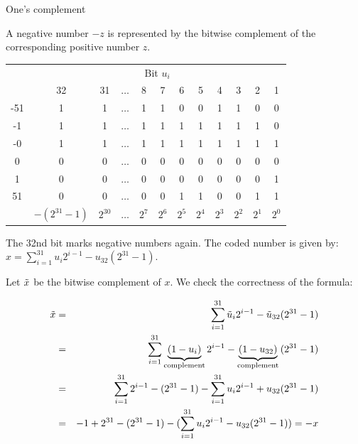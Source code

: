 \documentclass[11pt,compress,t,notes=noshow, xcolor=table]{beamer}
\begin{document}
\begin{vbframe}{One's complement}

A negative number $-z$ is represented by the bitwise complement of the corresponding positive number $z$.

\begin{footnotesize}
\begin{center}
  \begin{tabular}{ c | ccccccccccc}
    & \multicolumn{11}{c}{Bit $u_i$} \\
     & 32 & 31  & $\hdots$ & 8 & 7 & 6 & 5 & 4 & 3 & 2 & 1 \\
    \hline
    -51 & 1 & 1 & $\hdots$ & 1 & 1 & 0 & 0 & 1 & 1 & 0 & 0 \\
     -1 & 1 & 1 & $\hdots$ & 1 & 1 & 1 & 1 & 1 & 1 & 1 & 0 \\
     -0 & 1 & 1 & $\hdots$ & 1 & 1 & 1 & 1 & 1 & 1 & 1 & 1 \\
      0 & 0 & 0 & $\hdots$ & 0 & 0 & 0 & 0 & 0 & 0 & 0 & 0 \\
      1 & 0 & 0 & $\hdots$ & 0 & 0 & 0 & 0 & 0 & 0 & 0 & 1 \\
     51 & 0 & 0 & $\hdots$ & 0 & 0 & 1 & 1 & 0 & 0 & 1 & 1 \\
    \hline
       & $-(2^{31} - 1)$ & $2^{30}$ & $\hdots$ & $2^7$ & $2^6$ & $2^5$ & $2^4$ & $2^3$ & $2^2$ & $2^1$ & $2^0$
  \end{tabular}
\end{center}
\end{footnotesize}

The 32nd bit marks negative numbers again.
The coded number is given by: $x = \sum_{i=1}^{31} u_i 2^{i-1} - u_{32}(2^{31} - 1)$.

\framebreak

Let $\tilde x$ be the bitwise complement of $x$. We check the correctness of the formula: 

\vspace*{-.5cm}

\begin{eqnarray*}
  \tilde x &=& \sum_{i=1}^{31} \tilde u_i 2^{i-1} - \tilde u_{32}(2^{31} - 1) \\
  &=& \sum_{i=1}^{31} \underbrace{(1 - u_i)}_{\text{complement}} 2^{i-1} - \underbrace{(1 - u_{32})}_{\text{complement}}{(2^{31} - 1)}\\
  &=& \sum_{i=1}^{31} 2^{i-1} - (2^{31} - 1) - \sum_{i=1}^{31} u_i 2^{i-1} + u_{32}(2^{31} - 1)\\
  &=& -1 + 2^{31} - (2^{31} - 1) - (\sum_{i=1}^{31} u_i 2^{i-1} - u_{32}(2^{31} - 1)) = - x
\end{eqnarray*}



\end{vbframe}
\end{document}
